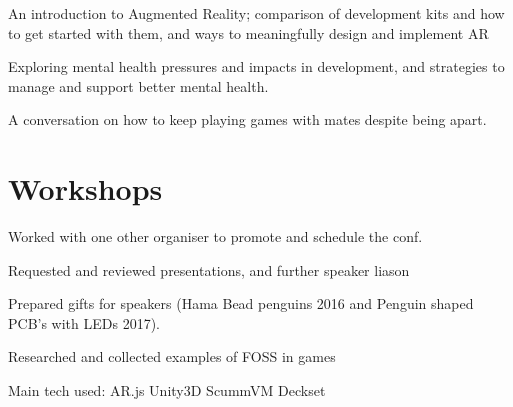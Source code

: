 \documentclass[a4paper]{deedy-resume_twopage} %
\begin{document}
\begin{minipage}[t]{0.66\textwidth}
  \sectionspace %



  An introduction to Augmented Reality; comparison of development kits and how to get started with them, and ways to
  meaningfully design and implement AR
  \sectionspace %



  Exploring mental health pressures and impacts in development, and strategies to manage and support better mental health.

  \sectionspace %



  A conversation on how to keep playing games with mates despite being apart.

  \sectionspace %

  \section{Workshops}


  \vspace{\topsep} %
  \begin{tightitemize}
  \item Worked with one other organiser to promote and schedule the conf.
  \item Requested and reviewed presentations, and further speaker liason %
  \item Prepared gifts for speakers (Hama Bead penguins 2016 and Penguin shaped PCB's with LEDs 2017).
  \item Researched and collected examples of FOSS in games %
  \end{tightitemize}
  Main tech used: \textbullet{} AR.js \textbullet{} Unity3D \textbullet{} ScummVM \textbullet{} Deckset


\end{minipage}
\end{document}
